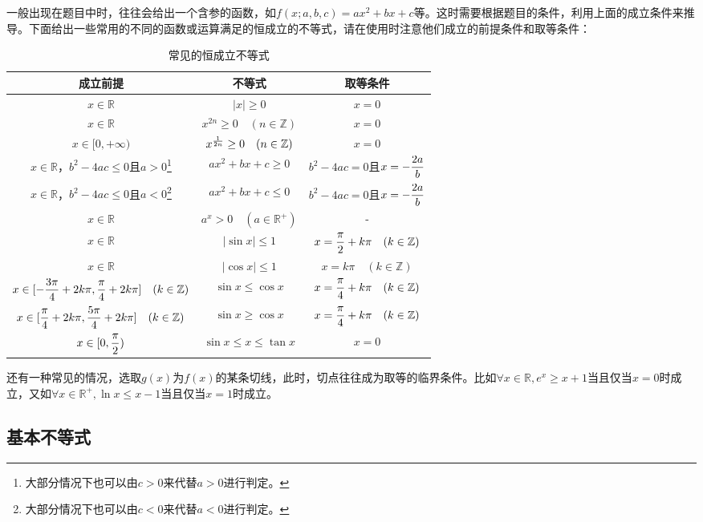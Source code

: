 一般出现在题目中时，往往会给出一个含参的函数，如$f(x;a,b,c)=ax^2+bx+c$等。这时需要根据题目的条件，利用上面的成立条件来推导。下面给出一些常用的不同的函数或运算满足的恒成立的不等式，请在使用时注意他们成立的前提条件和取等条件：
\begin{table}[ht]
\centering
\caption{常见的恒成立不等式}\label{tab_HsIden1}
\begin{tabular}{|c|c|c|}
\hline
成立前提 & 不等式 & 取等条件 \\
\hline
$x\in\mathbb{R}$&$|x|\geq0$&$x=0$ \\
\hline
$x\in\mathbb{R}$&$x^{2n}\geq0\quad(n\in\mathbb{Z})$&$x=0$\\
\hline
$x\in[0,+\infty)$&$x^{1\over2n}\geq0\quad(n\in\mathbb{Z})$&$x=0$\\
\hline
$x\in\mathbb{R}$，$b^2-4ac\leq0$且$a>0$\footnote{大部分情况下也可以由$c>0$来代替$a>0$进行判定。}&$ax^2+bx+c\geq0$&$b^2-4ac=0$且$\displaystyle x=-{2a\over b}$\\
\hline
$x\in\mathbb{R}$，$b^2-4ac\leq0$且$a<0$\footnote{大部分情况下也可以由$c<0$来代替$a<0$进行判定。}&$ax^2+bx+c\leq0$&$b^2-4ac=0$且$\displaystyle x=-{2a\over b}$\\
\hline
$x\in\mathbb{R}$&$a^x>0\quad(a\in\mathbb{R}^+)$&-\\
\hline
$x\in\mathbb{R}$&$|\sin x|\leq 1$&$\displaystyle x={\pi\over2}+k\pi\quad (k\in\mathbb{Z})$\\
\hline
$x\in\mathbb{R}$&$|\cos x|\leq 1$&$x=k\pi\quad (k\in\mathbb{Z})$\\
\hline

$\displaystyle x\in[-{3\pi\over4}+2k\pi,{\pi\over4}+2k\pi]\quad (k\in\mathbb{Z})$&$\sin x\leq\cos x$&$\displaystyle x={\pi\over4}+k\pi\quad (k\in\mathbb{Z})$\\
\hline
$\displaystyle x\in[{\pi\over4}+2k\pi,{5\pi\over4}+2k\pi]\quad (k\in\mathbb{Z})$&$\sin x\geq\cos x$&$\displaystyle x={\pi\over4}+k\pi\quad (k\in\mathbb{Z})$\\
\hline
$\displaystyle x\in[0,{\pi\over2})$&$\sin x\leq x\leq\tan x$&$x=0$\\
\hline
\end{tabular}
\end{table}


还有一种常见的情况，选取$g(x)$为$f(x)$的某条切线，此时，切点往往成为取等的临界条件。比如$\forall x\in\mathbb{R},e^x\geq x+1$当且仅当$x=0$时成立，又如$\forall x\in\mathbb{R}^+,\ln x\leq x-1$当且仅当$x=1$时成立。

\subsection{基本不等式}

